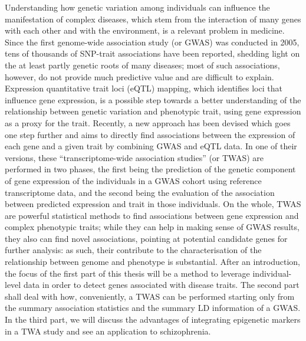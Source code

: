\documentclass[a4paper,oneside,marginals=justified,nobib]{tufte-book}
\begin{document}
Understanding how genetic variation among individuals can influence the 
manifestation of complex diseases, which stem from the interaction of 
many genes with each other and with the environment, is a relevant 
problem in medicine. Since the first genome-wide association study (or 
GWAS) was conducted in 2005, tens of thousands of SNP-trait associations 
have been reported, shedding light on the at least partly genetic roots 
of many diseases; most of such associations, however, do not provide 
much predictive value and are difficult to explain. Expression 
quantitative trait loci (eQTL) mapping, which identifies loci that 
influence gene expression, is a possible step towards a better 
understanding of the relationship between genetic variation and 
phenotypic trait, using gene expression as a proxy for the trait. 
Recently, a new approach has been devised which goes one step further 
and aims to directly find associations between the expression of each 
gene and a given trait by combining GWAS and eQTL data. In one of their 
versions, these \enquote{transcriptome-wide association studies} (or 
TWAS) are performed in two phases, the first being the prediction of the 
genetic component of gene expression of the individuals in a GWAS cohort 
using reference transcriptome data, and the second being the evaluation 
of the association between predicted expression and trait in those 
individuals. On the whole, TWAS are powerful statistical methods to find 
associations between gene expression and complex phenotypic traits; 
while they can help in making sense of GWAS results, they also can find 
novel associations, pointing at potential candidate genes for further 
analysis: as such, their contribute to the characterisation of the 
relationship between genome and phenotype is substantial. After an 
introduction, the focus of the first part of this thesis will be a 
method to leverage individual-level data in order to detect genes 
associated with disease traits. The second part shall deal with how, 
conveniently, a TWAS can be performed starting only from the summary 
association statistics and the summary LD information of a GWAS. In the 
third part, we will discuss the advantages of integrating epigenetic 
markers in a TWA study and see an application to schizophrenia. 



\mainmatter


\end{document}
